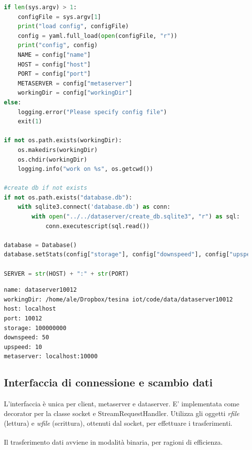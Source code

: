 \documentclass{article}
\begin{document}
\begin{lstlisting}[language=Python, title=Codice]
if len(sys.argv) > 1:
	configFile = sys.argv[1]
	print("load config", configFile)
	config = yaml.full_load(open(configFile, "r"))
	print("config", config)
	NAME = config["name"]
	HOST = config["host"]
	PORT = config["port"]
	METASERVER = config["metaserver"]
	workingDir = config["workingDir"]
else:
	logging.error("Please specify config file")
	exit(1)
	
if not os.path.exists(workingDir):
	os.makedirs(workingDir)
	os.chdir(workingDir)
	logging.info("work on %s", os.getcwd())

#create db if not exists
if not os.path.exists("database.db"):
	with sqlite3.connect('database.db') as conn:
		with open("../../dataserver/create_db.sqlite3", "r") as sql:
			conn.executescript(sql.read())

database = Database()
database.setStats(config["storage"], config["downspeed"], config["upspeed"])

SERVER = str(HOST) + ":" + str(PORT)

\end{lstlisting}

\begin{lstlisting}[title=Esempio di configurazione]
name: dataserver10012
workingDir: /home/ale/Dropbox/tesina iot/code/data/dataserver10012
host: localhost
port: 10012
storage: 100000000
downspeed: 50
upspeed: 10
metaserver: localhost:10000
\end{lstlisting}


\subsection{Interfaccia di connessione e scambio dati}

\paragraph{} L'interfaccia è unica per client, metaserver e dataserver. E' implementata come decorator per la classe socket e StreamRequestHandler. Utilizza gli oggetti \emph{rfile} (lettura) e \emph{wfile} (scrittura), ottenuti dal socket, per effettuare i trasferimenti. 

\paragraph{} Il trasferimento dati avviene in modalità binaria, per ragioni di efficienza. 
\end{document}
